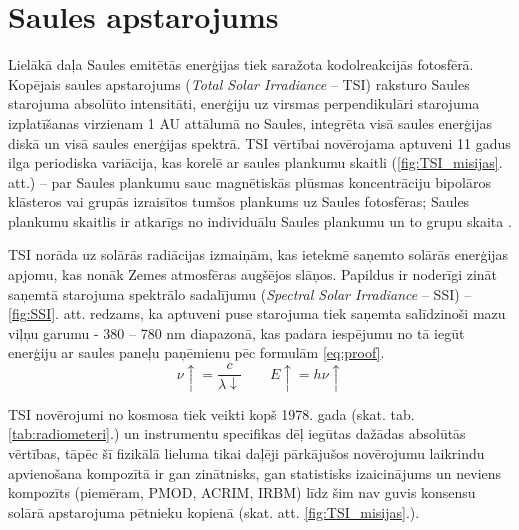 \section{Saules apstarojums}

Lielākā daļa Saules emitētās enerģijas tiek saražota kodolreakcijās fotosfērā. 
Kopējais saules apstarojums (\textit{Total Solar Irradiance} -- TSI) raksturo Saules starojuma absolūto intensitāti, enerģiju uz virsmas perpendikulāri starojuma izplatīšanas virzienam 1 AU attālumā no Saules, integrēta visā saules enerģijas diskā un visā saules enerģijas spektrā. TSI vērtībai novērojama aptuveni 11 gadus ilga periodiska variācija, kas korelē ar saules plankumu skaitli (\ref{fig:TSI_misijas}. att.) -- par Saules plankumu sauc magnētiskās plūsmas koncentrāciju bipolāros klāsteros vai grupās izraisītos tumšos plankums uz Saules fotosfēras; Saules plankumu skaitlis ir atkarīgs no individuālu Saules plankumu un to grupu skaita \cite{ThermalProcesses}.

TSI norāda uz solārās radiācijas izmaiņām, kas ietekmē saņemto solārās enerģijas apjomu, kas nonāk Zemes atmosfēras augšējos slāņos. Papildus ir noderīgi zināt saņemtā starojuma spektrālo sadalījumu (\textit{Spectral Solar Irradiance} -- SSI) -- \ref{fig:SSI}. att. redzams, ka aptuveni puse starojuma tiek saņemta salīdzinoši mazu viļņu garumu - 380 -- 780 nm diapazonā, kas padara iespējumu no tā iegūt enerģiju ar saules paneļu paņēmienu pēc formulām \ref{eq:proof}. 
\begin{equation}
\label{eq:proof}
\nu \uparrow = \frac{c}{\lambda \downarrow} \qquad E \uparrow = h \nu \uparrow 
\end{equation}

TSI novērojumi no kosmosa tiek veikti kopš 1978. gada (skat. tab. \ref{tab:radiometeri}.) un instrumentu specifikas dēļ iegūtas dažādas absolūtās vērtības, tāpēc šī fizikālā lieluma tikai daļēji pārkājušos novērojumu laikrindu apvienošana kompozītā ir gan zinātnisks, gan statistisks izaicinājums un neviens kompozīts (piemēram, PMOD, ACRIM, IRBM) līdz šim nav guvis konsensu solārā apstarojuma pētnieku kopienā (skat. att. \ref{fig:TSI_misijas}.).

